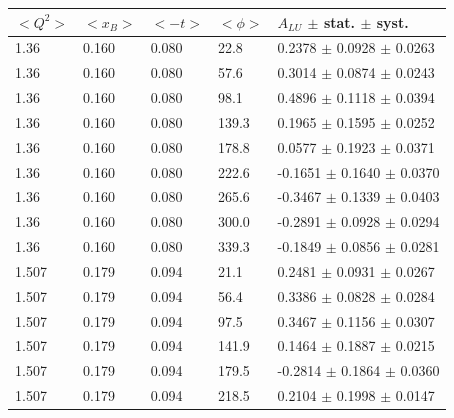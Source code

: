 \begin{table}[!h]
   \begin{center}
      \begin{tabular}{||l|l|l|l|l||}
         \hline
 $<Q^{2}>$ & $<x_{B}>$ & $<-t>$ & $<\phi>$ & $A_{LU}$ $\pm$ stat. $\pm$ syst.\\
  \hline
  1.36 & 0.160 & 0.080  & 22.8  &  0.2378 $\pm$ 0.0928 $\pm$ 0.0263 \\                                            
  1.36 & 0.160 & 0.080  & 57.6  &  0.3014 $\pm$ 0.0874 $\pm$ 0.0243 \\                                            
  1.36 & 0.160 & 0.080  & 98.1  &  0.4896 $\pm$ 0.1118 $\pm$ 0.0394 \\                                            
  1.36 & 0.160 & 0.080  & 139.3 &  0.1965 $\pm$ 0.1595 $\pm$ 0.0252 \\                                            
  1.36 & 0.160 & 0.080  & 178.8 &  0.0577 $\pm$ 0.1923 $\pm$ 0.0371 \\                                            
  1.36 & 0.160 & 0.080  & 222.6 & -0.1651 $\pm$ 0.1640 $\pm$ 0.0370 \\                                            
  1.36 & 0.160 & 0.080  & 265.6 & -0.3467 $\pm$ 0.1339 $\pm$ 0.0403 \\                                            
  1.36 & 0.160 & 0.080  & 300.0 & -0.2891 $\pm$ 0.0928 $\pm$ 0.0294 \\                                            
  1.36 & 0.160 & 0.080  & 339.3 & -0.1849 $\pm$ 0.0856 $\pm$ 0.0281 \\                                            
  \hline                                                                
  1.507 & 0.179 & 0.094 & 21.1  &  0.2481 $\pm$ 0.0931 $\pm$ 0.0267 \\                                            
  1.507 & 0.179 & 0.094 & 56.4  &  0.3386 $\pm$ 0.0828 $\pm$ 0.0284 \\                                            
  1.507 & 0.179 & 0.094 & 97.5  &  0.3467 $\pm$ 0.1156 $\pm$ 0.0307 \\                                            
  1.507 & 0.179 & 0.094 & 141.9 &  0.1464 $\pm$ 0.1887 $\pm$ 0.0215 \\                                            
  1.507 & 0.179 & 0.094 & 179.5 & -0.2814 $\pm$ 0.1864 $\pm$ 0.0360 \\                                            
  1.507 & 0.179 & 0.094 & 218.5 &  0.2104 $\pm$ 0.1998 $\pm$ 0.0147 \\                                            

\end{tabular}
\end{center}
\end{table}
